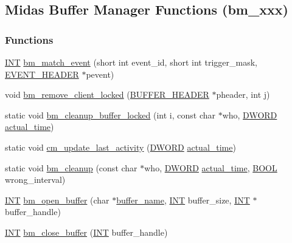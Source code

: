 \subsection{Midas Buffer Manager Functions (bm\_\-xxx)}
\label{group__bmfunctionc}
\subsubsection*{Functions}
\begin{DoxyCompactItemize}
\item 
\hyperlink{vppg_8h_a392e62da233ed3e2f7c3fd4f487a3896}{INT} \hyperlink{group__bmfunctionc_ga181dcf462745127aa3d011a2e3fee805}{bm\_\-match\_\-event} (short int event\_\-id, short int trigger\_\-mask, \hyperlink{structEVENT__HEADER}{EVENT\_\-HEADER} $\ast$pevent)
\item 
void \hyperlink{group__bmfunctionc_gaf13b277e24b666918ee8aec0160f5288}{bm\_\-remove\_\-client\_\-locked} (\hyperlink{structBUFFER__HEADER}{BUFFER\_\-HEADER} $\ast$pheader, int j)
\item 
static void \hyperlink{group__bmfunctionc_ga6a2a39a8d4d4a0302ec443762e7a34b4}{bm\_\-cleanup\_\-buffer\_\-locked} (int i, const char $\ast$who, \hyperlink{vt2_8h_a798af1e30bc65f319c1a246cecf59e39}{DWORD} \hyperlink{mevb_8c_a6431147bd66aebfe3ca728d244da1253}{actual\_\-time})
\item 
static void \hyperlink{group__bmfunctionc_ga2109ffa213706ade60f0b054d6c39164}{cm\_\-update\_\-last\_\-activity} (\hyperlink{vt2_8h_a798af1e30bc65f319c1a246cecf59e39}{DWORD} \hyperlink{mevb_8c_a6431147bd66aebfe3ca728d244da1253}{actual\_\-time})
\item 
static void \hyperlink{group__bmfunctionc_ga7ea560e34b23fa5fbf9596c2cc9d156d}{bm\_\-cleanup} (const char $\ast$who, \hyperlink{vt2_8h_a798af1e30bc65f319c1a246cecf59e39}{DWORD} \hyperlink{mevb_8c_a6431147bd66aebfe3ca728d244da1253}{actual\_\-time}, \hyperlink{vt2_8h_a239c7f0d40651c3e419c5b9651507d14}{BOOL} wrong\_\-interval)
\item 
\hyperlink{vppg_8h_a392e62da233ed3e2f7c3fd4f487a3896}{INT} \hyperlink{group__bmfunctionc_gae9636ff3e34ee94e31cb292bd07a679d}{bm\_\-open\_\-buffer} (char $\ast$\hyperlink{mevb_8c_a93bc09c1f5f9f26a081d11962971f301}{buffer\_\-name}, \hyperlink{vppg_8h_a392e62da233ed3e2f7c3fd4f487a3896}{INT} buffer\_\-size, \hyperlink{vppg_8h_a392e62da233ed3e2f7c3fd4f487a3896}{INT} $\ast$buffer\_\-handle)
\item 
\hyperlink{vppg_8h_a392e62da233ed3e2f7c3fd4f487a3896}{INT} \hyperlink{group__bmfunctionc_ga7b2cbde6caa572dfc978c780d63ab6be}{bm\_\-close\_\-buffer} (\hyperlink{vppg_8h_a392e62da233ed3e2f7c3fd4f487a3896}{INT} buffer\_\-handle)

\end{DoxyCompactItemize}
